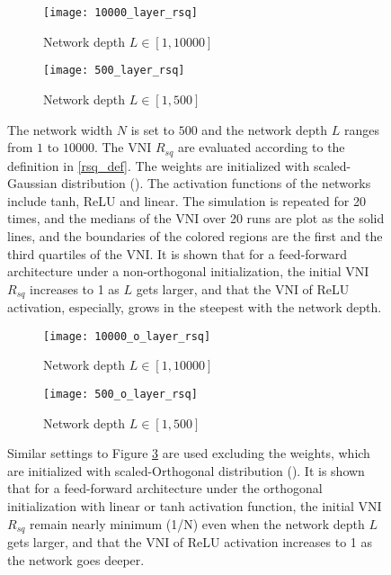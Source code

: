 \begin{figure}[h]
    \centering
    \newcommand{\myWidth}{0.9\textwidth}
    \begin{subfigure}{\myWidth}
      \centering
      \caption{Network depth $L\in[1, 10000]$}
      \texttt{[image: 10000\_layer\_rsq]}
      \label{fig:repr_general_a}
    \end{subfigure}
    
    \begin{subfigure}{\myWidth}
      \centering
      \caption{Network depth $L\in[1, 500]$}
      \texttt{[image: 500\_layer\_rsq]}
      \label{fig:repr_general_b}
    \end{subfigure}%
    \caption[The initial VNI $R_{sq}$ of Gaussian initialized networks.]{
        The network width $N$ is set to $500$ and the network depth $L$ ranges from $1$ to
        $10000$. The VNI $R_{sq}$ are evaluated according to the definition in \eqref{rsq_def}.
        The weights are initialized with scaled-Gaussian distribution (\cite{xavier, he}).
        The activation functions of the networks include tanh, ReLU and linear.
        The simulation is repeated for 20 times, and the medians of the VNI over 20 runs
        are plot as the solid lines, and the boundaries of the colored regions are the first
        and the third quartiles of the VNI. It is shown that for a feed-forward architecture
        under a non-orthogonal initialization, the initial VNI $R_{sq}$ increases to 1 as $L$
        gets larger, and that the VNI of ReLU activation, especially, grows in the steepest
        with the network depth.
    }
    \label{fig:repr_general}
\end{figure}


\begin{figure}[h]
    \centering
    \newcommand{\myWidth}{0.9\textwidth}
    \begin{subfigure}{\myWidth}
      \centering
      \caption{Network depth $L\in[1, 10000]$}
      \texttt{[image: 10000\_o\_layer\_rsq]}
      \label{fig:repr_orthogonal_a}
    \end{subfigure}
    
    \begin{subfigure}{\myWidth}
      \centering
      \caption{Network depth $L\in[1, 500]$}
      \texttt{[image: 500\_o\_layer\_rsq]}
      \label{fig:repr_orthogonal_b}
    \end{subfigure}%
    \caption[The initial VNI $R_{sq}$ of orthogonal initialized networks.]{
        Similar settings to Figure \ref{fig:repr_general} are used excluding the weights,
        which are initialized with scaled-Orthogonal distribution (\cite{mft:linear}).
        It is shown that for a feed-forward architecture under the orthogonal initialization
        with linear or tanh activation function, the initial VNI $R_{sq}$ remain nearly
        minimum (1/N) even when the network depth $L$ gets larger, and that the VNI of ReLU
        activation increases to 1 as the network goes deeper.
    }
    \label{fig:repr_orthogonal}
\end{figure}

